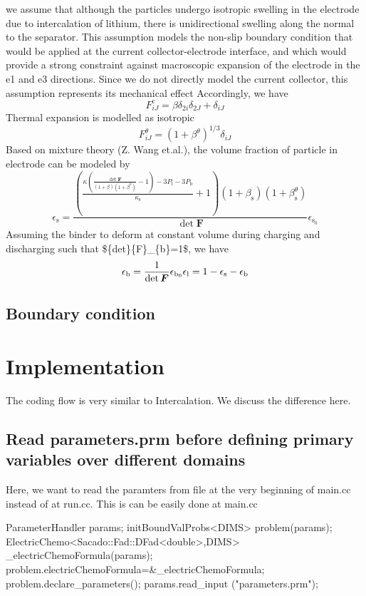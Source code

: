 we assume that although the particles undergo isotropic swelling in the electrode due to intercalation of lithium, there is unidirectional swelling along the normal to the separator. This assumption models the non-\/slip boundary condition that would be applied at the current collector-\/electrode interface, and which would provide a strong constraint against macroscopic expansion of the electrode in the e1 and e3 directions. Since we do not directly model the current collector, this assumption represents its mechanical effect Accordingly, we have \[ F^\text{c}_{iJ}=\beta\delta_{2i}\delta_{2J}+\delta_{iJ} \] Thermal expansion is modelled as isotropic \[ F^{\theta}_{iJ}=(1+\beta^{\theta})^{1/3}\delta_{iJ} \] Based on mixture theory (Z. Wang et.\-al.), the volume fraction of particle in electrode can be modeled by \[ \epsilon_\text{s}=\frac{\left( \frac{\kappa(\frac{\det\boldsymbol{F}}{(1+\beta)(1+\beta^\theta)}-1)-3P_\text{l}-3P_\text{b}}{\kappa_\text{s}} +1\right)(1+\beta_\text{s})(1+\beta_\text{s}^\theta)}{\det\boldsymbol{F}}\epsilon_{\text{s}_0} \] Assuming the binder to deform at constant volume during charging and discharging such that \$\{det\}\{F\}\-\_\-\{b\}=1\$, we have \[ \epsilon_\text{b}=\frac{1}{\det \boldsymbol{F}}\epsilon_{\text{b}_0}\\ \epsilon_\text{l}=1-\epsilon_{\text{s}}-\epsilon_\text{b} \] \hypertarget{battery_electrode_scale_sub2}{}\subsection{Boundary condition}\label{battery_electrode_scale_sub2}
 \hypertarget{battery_particle_Implementation}{}\section{Implementation}\label{battery_particle_Implementation}
The coding flow is very similar to Intercalation. We discuss the difference here.\hypertarget{battery_electrode_scale_sub1}{}\subsection{Read parameters.\-prm before defining primary variables over different domains}\label{battery_electrode_scale_sub1}
Here, we want to read the paramters from file at the very beginning of main.\-cc instead of at run.\-cc. This is can be easily done at main.\-cc 
\begin{DoxyCode}
ParameterHandler params;
initBoundValProbs<DIMS> problem(params);
ElectricChemo<Sacado::Fad::DFad<double>,DIMS> \_electricChemoFormula(params);
problem.electricChemoFormula=&\_electricChemoFormula;
problem.declare\_parameters();
params.read\_input (\textcolor{stringliteral}{"parameters.prm"});
\end{DoxyCode}
